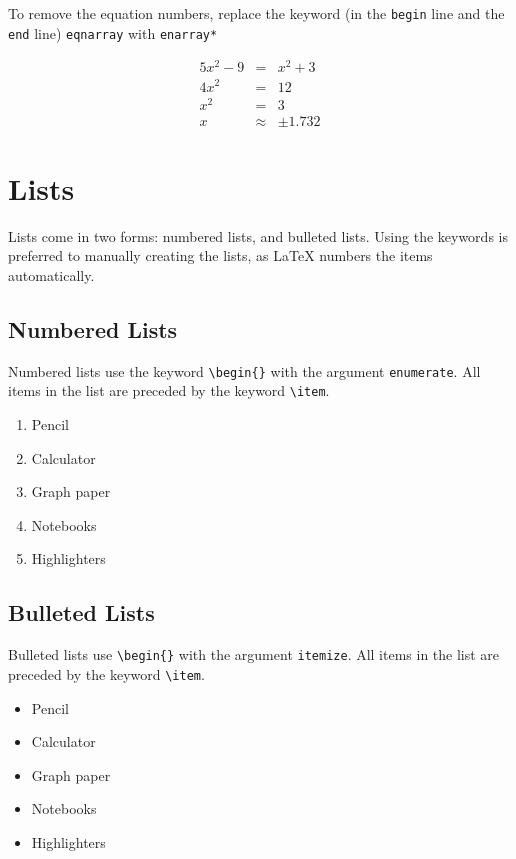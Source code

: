 \documentclass[11pt]{article}
\begin{document}
To remove the equation numbers, replace the keyword (in the \texttt{begin} line and the \texttt{end} line) \texttt{eqnarray} with \texttt{enarray*}

\begin{eqnarray*}
5x^2 - 9 &=& x^2 + 3 \\ 
4x^2 &=& 12 \\
x^2 &=& 3 \\
x&\approx&\pm{1.732}
\end{eqnarray*}

\section{Lists}

Lists come in two forms: numbered lists, and bulleted lists. Using the keywords is preferred to manually creating the lists, as LaTeX numbers the items automatically. 

\subsection{Numbered Lists}
Numbered lists use the keyword \texttt{\textbackslash begin\{\}} with the argument \texttt{enumerate}. All items in the list are preceded by the keyword \texttt{\textbackslash item}.

\begin{enumerate}
	\item Pencil
	\item Calculator
	\item Graph paper
	\item Notebooks
	\item Highlighters
\end{enumerate}

\subsection{Bulleted Lists}
Bulleted lists use \texttt{\textbackslash begin\{\}} with the argument \texttt{itemize}. All items in the list are preceded by the keyword \texttt{\textbackslash item}.

\begin{itemize}
	\item Pencil
	\item Calculator
	\item Graph paper
	\item Notebooks
	\item Highlighters
\end{itemize}
\end{document}
